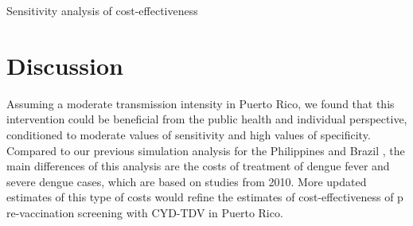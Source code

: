 \documentclass[12pt]{article}
\begin{document}
\begin{table}[ht]
  \centering
  
  \caption{Sensitivity analysis of cost-effectiveness} 
  \label{table-tornado}
\end{table}

\section{Discussion}
Assuming a moderate transmission intensity in Puerto Rico, we found that this intervention could be beneficial from the public health and individual perspective, conditioned to moderate values of sensitivity and high values of specificity. Compared to our previous simulation analysis for the Philippines and Brazil \cite{Espana2019Biorxiv}, the main differences of this analysis are the costs of treatment of dengue fever and severe dengue cases, which are based on studies from 2010. More updated estimates of this type of costs would refine the estimates of cost-effectiveness of p re-vaccination screening with CYD-TDV in Puerto Rico. 

 
 
\end{document}
